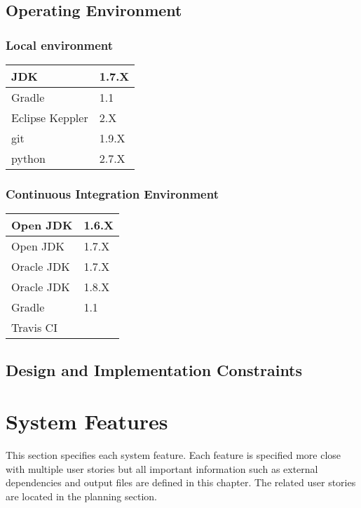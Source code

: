 \subsection{Operating Environment}

\subsubsection{Local environment}

\begin{tabular}{| p{3cm} | p{3cm} |}
	\hline
	JDK & 1.7.X  \\ \hline
	Gradle & 1.1 \\ \hline
	Eclipse Keppler & 2.X \\ \hline
	git & 1.9.X \\ \hline
	python & 2.7.X \\ \hline
\end{tabular}


\subsubsection{Continuous Integration Environment}

\begin{tabular}{| p{3cm} | p{3cm} |}
	\hline
	Open JDK & 1.6.X  \\ \hline
	Open JDK & 1.7.X  \\ \hline
	Oracle JDK & 1.7.X \\ \hline
	Oracle JDK & 1.8.X  \\ \hline
	Gradle & 1.1 \\ \hline
	Travis CI &  \\ \hline
\end{tabular}



\subsection{Design and Implementation Constraints}




\section{System Features}

This section specifies each system feature. Each feature is specified more close with multiple user stories but all important information such as external dependencies and output files are defined in this chapter. The related user stories are located in the planning section.  

